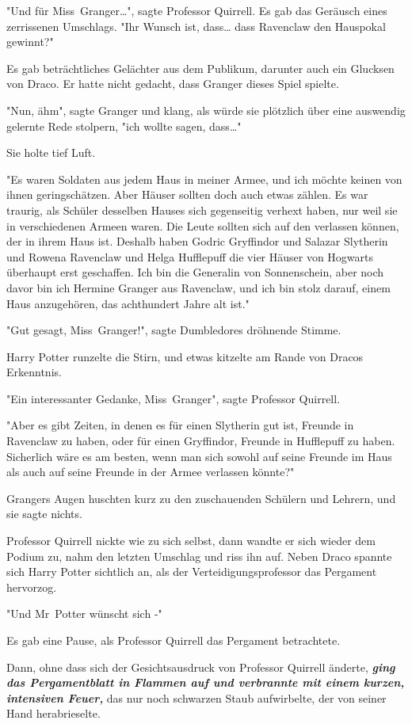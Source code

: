{"Und für Miss~Granger…", sagte Professor Quirrell. Es gab das Geräusch eines zerrissenen Umschlags. "Ihr Wunsch ist, dass… dass Ravenclaw den Hauspokal gewinnt?"

Es gab beträchtliches Gelächter aus dem Publikum, darunter auch ein Glucksen von Draco. Er hatte nicht gedacht, dass Granger dieses Spiel spielte.

"Nun, ähm", sagte Granger und klang, als würde sie plötzlich über eine auswendig gelernte Rede stolpern, "ich wollte sagen, dass…"

Sie holte tief Luft.

"Es waren Soldaten aus jedem Haus in meiner Armee, und ich möchte keinen von ihnen geringschätzen. Aber Häuser sollten doch auch etwas zählen. Es war traurig, als Schüler desselben Hauses sich gegenseitig verhext haben, nur weil sie in verschiedenen Armeen waren. Die Leute sollten sich auf den verlassen können, der in ihrem Haus ist. Deshalb haben Godric Gryffindor und Salazar Slytherin und Rowena Ravenclaw und Helga Hufflepuff die vier Häuser von Hogwarts überhaupt erst geschaffen. Ich bin die Generalin von Sonnenschein, aber noch davor bin ich Hermine Granger aus Ravenclaw, und ich bin stolz darauf, einem Haus anzugehören, das achthundert Jahre alt ist."

"Gut gesagt, Miss~Granger!", sagte Dumbledores dröhnende Stimme.

Harry Potter runzelte die Stirn, und etwas kitzelte am Rande von Dracos Erkenntnis.

"Ein interessanter Gedanke, Miss~Granger", sagte Professor Quirrell.

"Aber es gibt Zeiten, in denen es für einen Slytherin gut ist, Freunde in Ravenclaw zu haben, oder für einen Gryffindor, Freunde in Hufflepuff zu haben. Sicherlich wäre es am besten, wenn man sich sowohl auf seine Freunde im Haus als auch auf seine Freunde in der Armee verlassen könnte?"

Grangers Augen huschten kurz zu den zuschauenden Schülern und Lehrern, und sie sagte nichts.

Professor Quirrell nickte wie zu sich selbst, dann wandte er sich wieder dem Podium zu, nahm den letzten Umschlag und riss ihn auf. Neben Draco spannte sich Harry Potter sichtlich an, als der Verteidigungsprofessor das Pergament hervorzog.

"Und Mr~Potter wünscht sich -"

Es gab eine Pause, als Professor Quirrell das Pergament betrachtete.

Dann, ohne dass sich der Gesichtsausdruck von Professor Quirrell änderte, \textbf{\emph{ging das Pergamentblatt in Flammen auf und verbrannte mit einem kurzen, intensiven Feuer,}} das nur noch schwarzen Staub aufwirbelte, der von seiner Hand herabrieselte.

}
